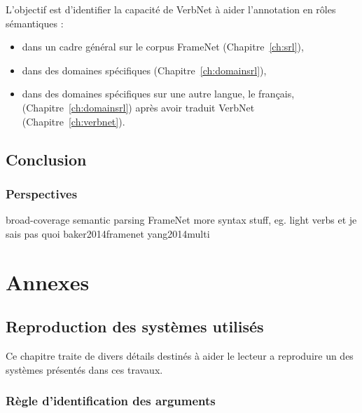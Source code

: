 \documentclass[oneside,parskip,draft]{scrbook}
\begin{document}
L'objectif est d'identifier la capacité de VerbNet à aider l'annotation en
rôles sémantiques :
\begin{itemize}
    \item dans un cadre général sur le corpus FrameNet (Chapitre~\ref{ch:srl}),
    \item dans des domaines spécifiques (Chapitre~\ref{ch:domainsrl}),
    \item dans des domaines spécifiques sur une autre langue, le français, (Chapitre~\ref{ch:domainsrl}) après avoir traduit VerbNet (Chapitre~\ref{ch:verbnet}).
\end{itemize}







\chapter*{Conclusion}
\label{ch:conc}

\section{Perspectives}

broad-coverage semantic parsing
FrameNet more syntax stuff, eg. light verbs et je sais pas quoi baker2014framenet yang2014multi

\backmatter




\part{Annexes}

\chapter{Reproduction des systèmes utilisés}

Ce chapitre traite de divers détails destinés à aider le lecteur a reproduire
un des systèmes présentés dans ces travaux.

\section{Règle d'identification des arguments}
\label{argument_identification}
\end{document}
